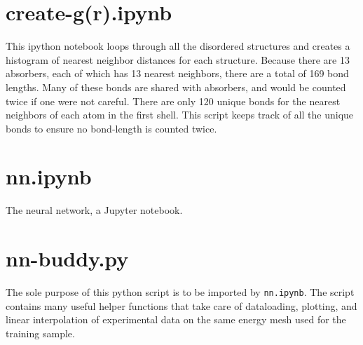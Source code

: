 \section{create-g(r).ipynb}

This ipython notebook loops through all the disordered structures and creates a histogram of nearest neighbor distances for each structure. Because there are 13 absorbers, each of which has 13 nearest neighbors, there are a total of 169 bond lengths. Many of these bonds are shared with absorbers, and would be counted twice if one were not careful. There are only 120 unique bonds for the nearest neighbors of each atom in the first shell. This script keeps track of all the unique bonds to ensure no bond-length is counted twice.

\section{nn.ipynb}
The neural network, a Jupyter notebook.

\section{nn-buddy.py}
The sole purpose of this python script is to be imported by \texttt{nn.ipynb}. The script contains many useful helper functions that take care of dataloading, plotting, and linear interpolation of experimental data on the same energy mesh used for the training sample.
